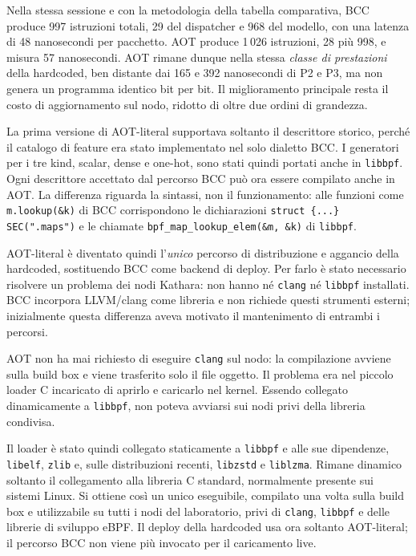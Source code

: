 \documentclass[binding=0.6cm,italian,oneside,noexaminfo]{sapthesis}
\begin{document}
Nella stessa sessione e con la metodologia della tabella comparativa, BCC produce 997 istruzioni totali, 29 del dispatcher e 968 del modello, con una latenza di 48 nanosecondi per pacchetto. AOT produce 1\,026 istruzioni, 28 più 998, e misura 57 nanosecondi. AOT rimane dunque nella stessa \emph{classe di prestazioni} della hardcoded, ben distante dai 165 e 392 nanosecondi di P2 e P3, ma non genera un programma identico bit per bit. Il miglioramento principale resta il costo di aggiornamento sul nodo, ridotto di oltre due ordini di grandezza.

La prima versione di AOT-literal supportava soltanto il descrittore storico, perché il catalogo di feature era stato implementato nel solo dialetto BCC. I generatori per i tre kind, scalar, dense e one-hot, sono stati quindi portati anche in \texttt{libbpf}. Ogni descrittore accettato dal percorso BCC può ora essere compilato anche in AOT. La differenza riguarda la sintassi, non il funzionamento: alle funzioni come \texttt{m.lookup(\&k)} di BCC corrispondono le dichiarazioni \texttt{struct \{...\} SEC(".maps")} e le chiamate \texttt{bpf\_map\_lookup\_elem(\&m, \&k)} di \texttt{libbpf}.

AOT-literal è diventato quindi l'\emph{unico} percorso di distribuzione e aggancio della hardcoded, sostituendo BCC come backend di deploy. Per farlo è stato necessario risolvere un problema dei nodi Kathara: non hanno né \texttt{clang} né \texttt{libbpf} installati. BCC incorpora LLVM/clang come libreria e non richiede questi strumenti esterni; inizialmente questa differenza aveva motivato il mantenimento di entrambi i percorsi.

AOT non ha mai richiesto di eseguire \texttt{clang} sul nodo: la compilazione avviene sulla build box e viene trasferito solo il file oggetto. Il problema era nel piccolo loader C incaricato di aprirlo e caricarlo nel kernel. Essendo collegato dinamicamente a \texttt{libbpf}, non poteva avviarsi sui nodi privi della libreria condivisa.

Il loader è stato quindi collegato staticamente a \texttt{libbpf} e alle sue dipendenze, \texttt{libelf}, \texttt{zlib} e, sulle distribuzioni recenti, \texttt{libzstd} e \texttt{liblzma}. Rimane dinamico soltanto il collegamento alla libreria C standard, normalmente presente sui sistemi Linux. Si ottiene così un unico eseguibile, compilato una volta sulla build box e utilizzabile su tutti i nodi del laboratorio, privi di \texttt{clang}, \texttt{libbpf} e delle librerie di sviluppo eBPF. Il deploy della hardcoded usa ora soltanto AOT-literal; il percorso BCC non viene più invocato per il caricamento live.
\end{document}
